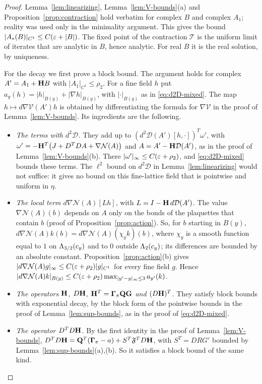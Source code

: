 \begin{proof}
Lemma~\ref{lem:linearizing}, Lemma~\ref{lem:V-bounds}(a) and Proposition~\ref{prop:contraction} hold verbatim for complex $B$ and complex $A_1$; reality was used only in the minimality argument. This gives the bound $|A_*(B)|_{C^1}\le C(\varepsilon+|B|)$. The fixed point of the contraction $\mathcal T$ is the uniform limit of iterates that are analytic in $B$, hence analytic. For real $B$ it is the real solution, by uniqueness.

For the decay we first prove a block bound. The argument holds for complex $A'=A_1+\mathbf H B$ with $|A_1|_{C^1}\le\rho_2$. For a fine field $h$ put $a_y(h)=|h|_{B(y)}+|\nabla h|_{B(y)}$, with $|\cdot|_{B(y)}$ as in \eqref{eq:d2D-mixed}. The map $h\mapsto d\nabla\mathcal V(A')h$ is obtained by differentiating the formula for $\nabla\mathcal V$ in the proof of Lemma~\ref{lem:V-bounds}. Its ingredients are the following.
\begin{itemize}
\item \emph{The terms with $d^2\mathcal D$.} They add up to $(d^2\mathcal D(A')[h,\cdot])^T\omega'$, with $\omega'=-\mathbf H^T\big(J+D^TDA+\nabla\mathcal N(A)\big)$ and $A=A'-\mathbf H\mathcal D(A')$, as in the proof of Lemma~\ref{lem:V-bounds}(b). There $|\omega'|_\infty\le C(\varepsilon+\rho_2)$, and \eqref{eq:d2D-mixed} bounds these terms. The $\ell^2$ bound on $d^2\mathcal D$ in Lemma~\ref{lem:linearizing} would not suffice: it gives no bound on this fine-lattice field that is pointwise and uniform in $\eta$.
\item \emph{The local term $d\nabla\mathcal N(A)[Lh]$}, with $L=I-\mathbf H\,d\mathcal D(A')$. The value $\nabla\mathcal N(A)(b)$ depends on $A$ only on the bonds of the plaquettes that contain $b$ (proof of Proposition~\ref{prop:action}). So, for $b$ starting in $B(y)$, $d\nabla\mathcal N(A)k(b)=d\nabla\mathcal N(A)(\chi_yk)(b)$, where $\chi_y$ is a smooth function equal to $1$ on $\Lambda_{3/2}(c_y)$ and to $0$ outside $\Lambda_2(c_y)$; its differences are bounded by an absolute constant. Proposition~\ref{prop:action}(b) gives $|d\nabla\mathcal N(A)g|_\infty\le C(\varepsilon+\rho_2)|g|_{C^1}$ for every fine field $g$. Hence $|d\nabla\mathcal N(A)k|_{B(y)}\le C(\varepsilon+\rho_2)\max_{|y'-y|_\infty\le3}a_{y'}(k)$.
\item \emph{The operators $\mathbf H$, $D\mathbf H$, $\mathbf H^T=\boldsymbol\Gamma_\pi\mathbf Q\mathbf G$ and $(D\mathbf H)^T$.} They satisfy block bounds with exponential decay, by the block form of the pointwise bounds in the proof of Lemma~\ref{lem:sup-bounds}, as in the proof of \eqref{eq:d2D-mixed}.
\item \emph{The operator $D^TD\mathbf H$.} By the first identity in the proof of Lemma~\ref{lem:V-bounds}, $D^TD\mathbf H=\mathbf Q^T(\boldsymbol\Gamma_\pi-a)+S^T\mathfrak F^TD\mathbf H$, with $S^T=DRG'$ bounded by Lemma~\ref{lem:sup-bounds}(a),(b). So it satisfies a block bound of the same kind.

\end{itemize}
\end{proof}
